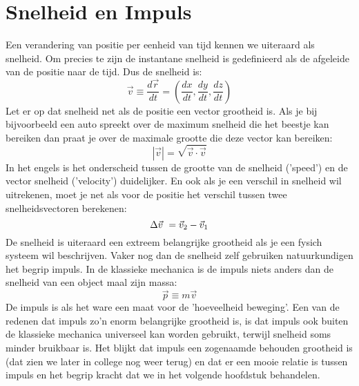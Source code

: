 \section{Snelheid en Impuls}

Een verandering van positie per eenheid van tijd kennen we uiteraard als snelheid. Om precies te zijn de instantane snelheid is gedefinieerd als de afgeleide van de positie naar de tijd. Dus de snelheid is:
\begin{equation}
\vec{v} \equiv \frac{d\vec{r}}{dt} = \left(\frac{dx}{dt}, \frac{dy}{dt}, \frac{dz}{dt}\right)
\end{equation}
Let er op dat snelheid net als de positie een vector grootheid is. Als je bij bijvoorbeeld een auto spreekt over de maximum snelheid die het beestje kan bereiken dan praat je over de maximale grootte die deze vector kan bereiken:
\begin{equation}
|\vec{v}| = \sqrt{\vec{v}\cdot\vec{v}}
\end{equation}
In het engels is het onderscheid tussen de grootte van de snelheid ('speed') en de vector snelheid ('velocity')  duidelijker. En ook als je een verschil in snelheid wil uitrekenen, moet je net
als voor de positie het verschil tussen twee snelheidsvectoren berekenen:
\begin{equation}
\Delta\vec{v}~ = \vec{v}_2 - \vec{v}_1
\end{equation} 
De snelheid is uiteraard een extreem belangrijke grootheid als je een fysich systeem wil beschrijven. Vaker nog dan de snelheid zelf gebruiken natuurkundigen het begrip impuls. In de klassieke mechanica is de impuls niets anders dan de snelheid van een object  maal zijn massa:
\begin{equation}
\vec{p} \equiv m \vec{v}
\end{equation}
De impuls is als het ware een maat voor de 'hoeveelheid beweging'. Een van de redenen dat impuls zo'n enorm belangrijke grootheid is, is dat impuls ook buiten de klassieke mechanica universeel kan worden gebruikt, terwijl snelheid soms minder bruikbaar is. Het blijkt dat impuls een zogenaamde behouden grootheid is (dat zien we later in college nog weer terug) en dat er een mooie relatie is tussen impuls en het begrip kracht dat we in het volgende hoofdstuk behandelen.

